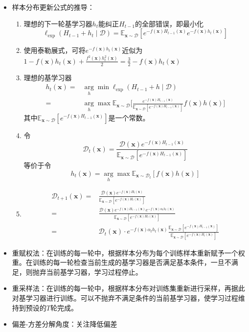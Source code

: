 \documentclass{ctexart}
\begin{document}
\begin{itemize}
						\item 样本分布更新公式的推导：\begin{enumerate}
							\item 理想的下一轮基学习器$h_t$能纠正$H_{t-1}$的全部错误，即最小化\[\ell_{\mathrm{exp}}(H_{t-1}+h_t\mid\mathcal{D})=\mathbb{E}_{\bm{x}\sim\mathcal{D}}[e^{-f(\bm{x})H_{t-1}(\bm{x})}e^{-f(\bm{x})h_t(\bm{x})}]\]
							\item 使用泰勒展式，可将$e^{-f(\bm{x})h_t(\bm{x})}$近似为$1-f(\bm{x})h_t(\bm{x})+\frac{f^2(\bm{x})h_t^2(\bm{x})}{2}=\frac{3}{2}-f(\bm{x})h_t(\bm{x})$
							\item 理想的基学习器\begin{align*}
								h_t(\bm{x}) = & \arg\limits_{h}\min\ell_{\mathrm{exp}}(H_{t-1}+h\mid\mathcal{D})\\
								=& \arg\limits_{h}\max\mathbb{E}_{\bm{x}\sim\mathcal{D}}\bigg[\frac{e^{-f(\bm{x})H_{t-1}(\bm{x})}}{\mathbb{E}_{\bm{x}\sim\mathcal{D}}[e^{-f(\bm{x})H_{t-1}(\bm{x})}]}f(\bm{x})h(\bm{x})\bigg]
							\end{align*}
							其中$\mathbb{E}_{\bm{x}\sim\mathcal{D}}[e^{-f(\bm{x})H_{t-1}(\bm{x})}]$是一个常数。
							\item 令\[\mathcal{D}_t(\bm{x})=\frac{\mathcal{D}(\bm{x})e^{-f(\bm{x})H_{t-1}(\bm{x})}}{\mathbb{E}_{\bm{x}\sim\mathcal{D}}[e^{-f(\bm{x})H_{t-1}(\bm{x})}]}\]等价于令\[h_t(\bm{x})=\arg\limits_{h}\max\mathbb{E}_{\bm{x}\sim\mathcal{D}_t}[f(\bm{x})h(\bm{x})]\]
							\item \begin{align*}
								\mathcal{D}_{t+1}(\bm{x}) = & \frac{\mathcal{D}(\bm{x})e^{-f(\bm{x})H_t(\bm{x})}}{\mathbb{E}_{\bm{x}\sim\mathcal{D}}[e^{-f(\bm{x})H_t(\bm{x})}]}\\
								= & \frac{\mathcal{D}(\bm{x})e^{-f(\bm{x})H_{t-1}(\bm{x})}e^{-f(\bm{x})\alpha_th_t(\bm{x})}}{\mathbb{E}_{\bm{x}\sim\mathcal{D}}[e^{-f(\bm{x})H_t(\bm{x})}]}\\
								= & \mathcal{D}_t(\bm{x})\cdot e^{-f(\bm{x})\alpha_th_t(\bm{x})}\frac{\mathbb{E}_{\bm{x}\sim\mathcal{D}}[e^{-f(\bm{x})H_{t-1}(\bm{x})}]}{\mathbb{E}_{\bm{x}\sim\mathcal{D}}[e^{-f(\bm{x})H_{t}(\bm{x})}]}
							\end{align*}
						\end{enumerate}
						\item 重赋权法：在训练的每一轮中，根据样本分布为每个训练样本重新赋予一个权重。在训练的每一轮检查当前生成的基学习器是否满足基本条件，一旦不满足，则抛弃当前基学习器，学习过程停止。
						\item 重采样法：在训练的每一轮中，根据样本分布对训练集重新进行采样，再据此对基学习器进行训练。可以不抛弃不满足条件的当前基学习器，使学习过程维持到预设的$T$轮完成。
						\item 偏差-方差分解角度：关注降低偏差
					\end{itemize}
\end{document}
